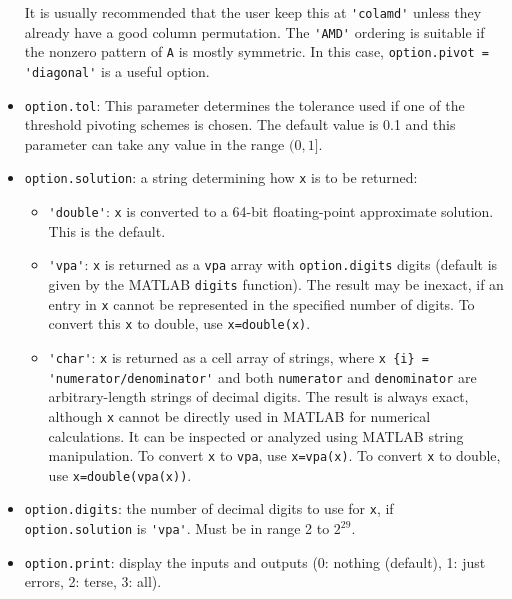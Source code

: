 \documentclass[12pt]{article}
\theoremstyle{definition}
\begin{document}
\begin{itemize}
It is usually recommended that the user keep this at \verb|'colamd'| unless
they already have a good column permutation.  The \verb|'AMD'| ordering is
suitable if the nonzero pattern of \verb'A' is mostly symmetric.  In this
case, \verb|option.pivot = 'diagonal'| is a useful option.

\item \verb|option.tol|: This parameter determines the tolerance used if one of
the threshold pivoting schemes is chosen. The default value is 0.1 and this
parameter can take any value in the range $(0,1]$.

\item \verb|option.solution|:
    a string determining how \verb|x| is to be returned:

    \begin{itemize}
        \item \verb|'double'|:  \verb|x| is converted to a 64-bit
            floating-point approximate solution.  This is the default.
        \item \verb|'vpa'|:  \verb|x| is returned as a \verb|vpa| array with
            \verb|option.digits| digits (default is given by the MATLAB
            \verb|digits| function).  The result may be inexact, if an entry in
            \verb|x| cannot be represented in the specified number of digits.
            To convert this \verb|x| to double, use \verb|x=double(x)|.
        \item \verb|'char'|:  \verb|x| is returned as a cell array of strings,
            where \verb|x {i} =| \newline \verb|'numerator/denominator'| and both
            \verb|numerator| and \verb|denominator| are arbitrary-length
            strings of decimal digits.  The result is always exact, although
            \verb|x| cannot be directly used in MATLAB for numerical
            calculations.  It can be inspected or analyzed using MATLAB string
            manipulation.  To convert \verb|x| to \verb|vpa|, use
            \verb|x=vpa(x)|.  To convert \verb|x| to double, use
            \verb|x=double(vpa(x))|.
    \end{itemize}

\item \verb|option.digits|: the number of decimal digits to use for \verb|x|, if
        \verb|option.solution| is \verb|'vpa'|.  Must be in range 2 to $2^{29}$.

\item \verb|option.print|: display the inputs and outputs
        (0: nothing (default), 1: just errors, 2: terse, 3: all).

\end{itemize}
\end{document}
